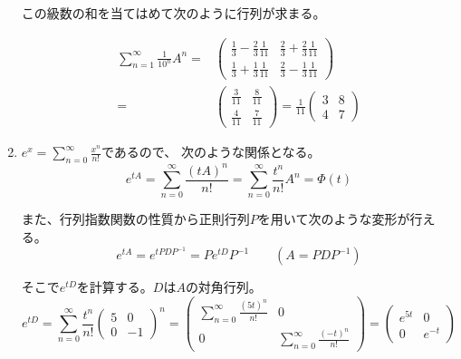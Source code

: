 \documentclass[12pt,b5paper]{ltjsarticle}
\begin{document}
\begin{enumerate}
      この級数の和を当てはめて次のように行列が求まる。

      \begin{align}
       \sum_{n=1}^{\infty}\frac{1}{10^n}A^n
       =&
       \begin{pmatrix}
         \frac{1}{3}-\frac{2}{3}\frac{1}{11} & \frac{2}{3}+\frac{2}{3}\frac{1}{11} \\
         \frac{1}{3}+\frac{1}{3}\frac{1}{11} & \frac{2}{3}-\frac{1}{3}\frac{1}{11}
       \end{pmatrix}\\
       =&
       \begin{pmatrix}
         \frac{3}{11} & \frac{8}{11} \\
         \frac{4}{11} & \frac{7}{11}
       \end{pmatrix}
       =\frac{1}{11} \begin{pmatrix} 3 & 8 \\ 4 & 7 \end{pmatrix}
      \end{align}

      \dotfill
 \item
      $e^x = \sum_{n=0}^{\infty}\frac{x^n}{n!}$であるので、
      次のような関係となる。
      \begin{equation}
       e^{tA} = \sum_{n=0}^{\infty}\frac{(tA)^n}{n!}
        = \sum_{n=0}^{\infty}\frac{t^n}{n!}A^n
        = \Phi(t)
      \end{equation}

      また、行列指数関数の性質から正則行列$P$を用いて次のような変形が行える。
      \begin{equation}
       e^{tA}=e^{tPDP^{-1}}=P e^{tD} P^{-1}
        \qquad (A=PDP^{-1})
      \end{equation}

      そこで$e^{tD}$を計算する。$D$は$A$の対角行列。
      \begin{equation}
       e^{tD} = \sum_{n=0}^{\infty}\frac{t^n}{n!}\begin{pmatrix} 5 & 0 \\ 0 & -1 \end{pmatrix}^n
       =\begin{pmatrix} \sum_{n=0}^{\infty}\frac{(5t)^n}{n!} & 0 \\ 0 & \sum_{n=0}^{\infty}\frac{(-t)^n}{n!} \end{pmatrix}
       =\begin{pmatrix} e^{5t} & 0 \\ 0 & e^{-t} \end{pmatrix}
      \end{equation}


\end{enumerate}
\end{document}
